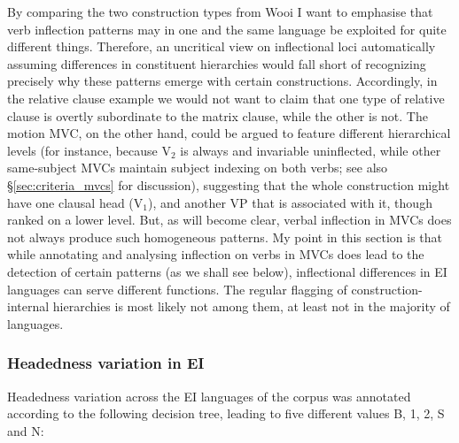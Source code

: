 By comparing the two construction types from Wooi I want to emphasise that verb inflection patterns may in one and the same language be exploited for quite different things. Therefore, an uncritical view on inflectional loci automatically assuming differences in constituent hierarchies would fall short of recognizing precisely why these patterns emerge with certain constructions. Accordingly, in the relative clause example we would not want to claim that one type of relative clause is overtly subordinate to the matrix clause, while the other is not. The motion MVC, on the other hand, could be argued to feature different hierarchical levels (for instance, because V$_2$ is always and invariable uninflected, while other same-subject MVCs maintain subject indexing on both verbs; see also §\ref{sec:criteria_mvcs} for discussion), suggesting that the whole construction might have one clausal head (V$_1$), and another VP that is associated with it, though ranked on a lower level. But, as will become clear, verbal inflection in MVCs does not always produce such homogeneous patterns. My point in this section is that while annotating and analysing inflection on verbs in MVCs does lead to the detection of certain patterns (as we shall see below), inflectional differences in EI languages can serve different functions. The regular flagging of construction-internal hierarchies is most likely not among them, at least not in the majority of languages.

\subsubsection{Headedness variation in EI}\label{sec:headednessEI}

Headedness variation across the EI languages of the corpus was annotated according to the following decision tree, leading to five different values B, 1, 2, S and N:

